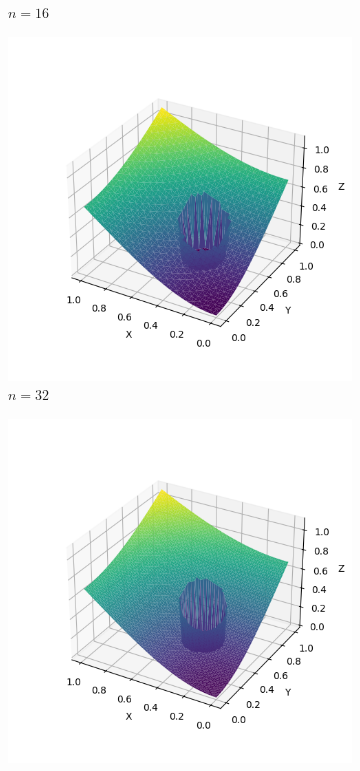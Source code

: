 \documentclass[lang=cn,a4paper,newtx,bibend=bibtex]{elegantpaper}
\begin{document}
\begin{figure}[H]
\begin{subfigure}[b]{0.18\textwidth}
      \caption{$n= 16$}
  \end{subfigure}
  \hfill
  \begin{subfigure}[b]{0.18\textwidth}
      \includegraphics[width=\textwidth]{../../res_bac/res-[data|3-mixed-irregular-c32].png}
      \caption{$n = 32$}
  \end{subfigure}
  \hfill
  \begin{subfigure}[b]{0.18\textwidth}
      \includegraphics[width=\textwidth]{../../res_bac/res-[data|3-mixed-irregular-d64].png}

\end{subfigure}
\end{figure}
\end{document}
